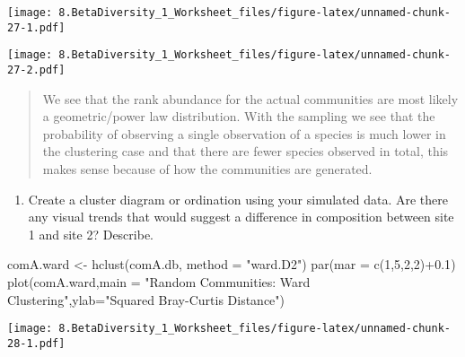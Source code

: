 \documentclass[
]{article}
\newenvironment{Shaded}{\begin{snugshade}}{\end{snugshade}}
\newcommand{\AttributeTok}[1]{\textcolor[rgb]{0.77,0.63,0.00}{#1}}
\newcommand{\DecValTok}[1]{\textcolor[rgb]{0.00,0.00,0.81}{#1}}
\newcommand{\FloatTok}[1]{\textcolor[rgb]{0.00,0.00,0.81}{#1}}
\newcommand{\FunctionTok}[1]{\textcolor[rgb]{0.00,0.00,0.00}{#1}}
\newcommand{\NormalTok}[1]{#1}
\newcommand{\OtherTok}[1]{\textcolor[rgb]{0.56,0.35,0.01}{#1}}
\newcommand{\SpecialCharTok}[1]{\textcolor[rgb]{0.00,0.00,0.00}{#1}}
\newcommand{\StringTok}[1]{\textcolor[rgb]{0.31,0.60,0.02}{#1}}
\providecommand{\tightlist}{%
  \setlength{\itemsep}{0pt}\setlength{\parskip}{0pt}}
\begin{document}
\texttt{[image: 8.BetaDiversity\_1\_Worksheet\_files/figure-latex/unnamed-chunk-27-1.pdf]}

\begin{Shaded}
\end{Shaded}

\texttt{[image: 8.BetaDiversity\_1\_Worksheet\_files/figure-latex/unnamed-chunk-27-2.pdf]}

\begin{quote}
We see that the rank abundance for the actual communities are most
likely a geometric/power law distribution. With the sampling we see that
the probability of observing a single observation of a species is much
lower in the clustering case and that there are fewer species observed
in total, this makes sense because of how the communities are generated.
\end{quote}

\begin{enumerate}
\def\labelenumi{\arabic{enumi})}
\setcounter{enumi}{1}
\tightlist
\item
  Create a cluster diagram or ordination using your simulated data. Are
  there any visual trends that would suggest a difference in composition
  between site 1 and site 2? Describe.
\end{enumerate}

\begin{Shaded}
\begin{Highlighting}[]
\NormalTok{comA.ward }\OtherTok{\textless{}{-}} \FunctionTok{hclust}\NormalTok{(comA.db, }\AttributeTok{method =} \StringTok{"ward.D2"}\NormalTok{)}
\FunctionTok{par}\NormalTok{(}\AttributeTok{mar =} \FunctionTok{c}\NormalTok{(}\DecValTok{1}\NormalTok{,}\DecValTok{5}\NormalTok{,}\DecValTok{2}\NormalTok{,}\DecValTok{2}\NormalTok{)}\SpecialCharTok{+}\FloatTok{0.1}\NormalTok{)}
\FunctionTok{plot}\NormalTok{(comA.ward,}\AttributeTok{main =} \StringTok{"Random Communities: Ward Clustering"}\NormalTok{,}\AttributeTok{ylab=}\StringTok{"Squared Bray{-}Curtis Distance"}\NormalTok{)}
\end{Highlighting}
\end{Shaded}

\texttt{[image: 8.BetaDiversity\_1\_Worksheet\_files/figure-latex/unnamed-chunk-28-1.pdf]}
\end{document}
